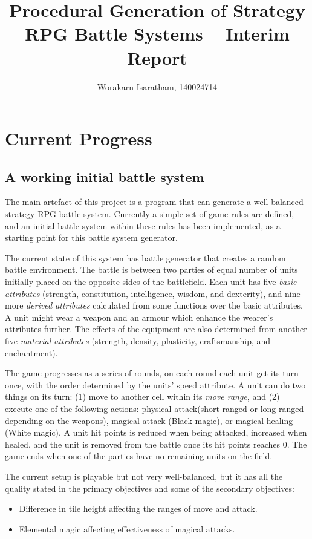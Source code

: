 \documentclass[a4paper,11pt]{article}
\title{Procedural Generation of Strategy RPG Battle Systems -- Interim Report}
\author{Worakarn Isaratham, 140024714}
\begin{document}
\maketitle
	
\section*{Current Progress}

\subsection*{A working initial battle system}

The main artefact of this project is a program that can generate a well-balanced strategy RPG battle system. Currently a simple set of game rules are defined, and an initial battle system within these rules has been implemented, as a starting point for this battle system generator.

The current state of this system has battle generator that creates a random battle environment. The battle is between two parties of equal number of units initially placed on the opposite sides of the battlefield. Each unit has five \textit{basic attributes} (strength, constitution, intelligence, wisdom, and dexterity), and nine more \textit{derived attributes} calculated from some functions over the basic attributes. A unit might wear a weapon and an armour which enhance the wearer's attributes further. The effects of the equipment are also determined from another five \textit{material attributes} (strength, density, plasticity, craftsmanship, and enchantment). 

The game progresses as a series of rounds, on each round each unit get its turn once, with the order determined by the units' speed attribute. A unit can do two things on its turn: (1) move to another cell within its \textit{move range}, and (2) execute one of the following actions: physical attack(short-ranged or long-ranged depending on the weapons), magical attack (Black magic), or magical healing (White magic). A unit hit points is reduced when being attacked, increased when healed, and the unit is removed from the battle once its hit points reaches 0. The game ends when one of the parties have no remaining units on the field. 

The current setup is playable but not very well-balanced, but it has all the quality stated in the primary objectives and some of the secondary objectives:
\begin{itemize}
	\item Difference in tile height affecting the ranges of move and attack.
	\item Elemental magic affecting effectiveness of magical attacks.
\end{itemize}
\end{document}
